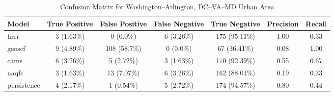 \begin{table}[h!]
\centering
\begin{tabular}{lcccccc}
\hline
Model & True Positive & False Positive & False Negative & True Negative & Precision & Recall\\ \hline
hrrr & 3 (1.63\%) & 0 (0.0\%) & 6 (3.26\%) & 175 (95.11\%) & \cellcolor{green!25}1.00 & \cellcolor{red!25}0.33 \\ 
geoscf & 9 (4.89\%) & 108 (58.7\%) & 0 (0.0\%) & 67 (36.41\%) & \cellcolor{red!25}0.08 & \cellcolor{green!25}1.00 \\ 
cams & 6 (3.26\%) & 5 (2.72\%) & 3 (1.63\%) & 170 (92.39\%) & \cellcolor{red!25}0.55 & \cellcolor{green!25}0.67 \\ 
naqfc & 3 (1.63\%) & 13 (7.07\%) & 6 (3.26\%) & 162 (88.04\%) & \cellcolor{red!25}0.19 & \cellcolor{red!25}0.33 \\ 
persistence & 4 (2.17\%) & 1 (0.54\%) & 5 (2.72\%) & 174 (94.57\%) & 0.80 & 0.44 \\ 
\hline
\end{tabular}
\caption{Confusion Matrix for Washington--Arlington, DC--VA--MD Urban Area}
\end{table}

